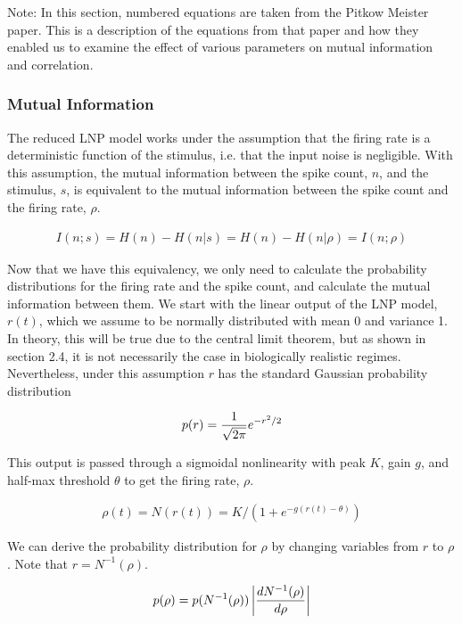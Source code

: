 \documentclass[12pt]{article}
\begin{document}
Note: In this section, numbered equations are taken from the Pitkow Meister paper. This is a description of the equations from that paper and how they enabled us to examine the effect of various parameters on mutual information and correlation.

\subsubsection{Mutual Information}

The reduced LNP model works under the assumption that the firing rate is a deterministic function of the stimulus, i.e. that the input noise is negligible. With this assumption, the mutual information between the spike count, $n$, and the stimulus, $s$, is equivalent to the mutual information between the spike count and the firing rate, $\rho$.

\begin{align}
\displaystyle I(n;s) = H(n)-H(n|s)=H(n)-H(n|\rho)=I(n;\rho) \tag{18}
\end{align}

\noindent Now that we have this equivalency, we only need to calculate the probability distributions for the firing rate and the spike count, and calculate the mutual information between them. We start with the linear output of the LNP model, $r(t)$, which we assume to be normally distributed with mean 0 and variance 1. In theory, this will be true due to the central limit theorem, but as shown in section 2.4, it is not necessarily the case in biologically realistic regimes. Nevertheless, under this assumption $r$ has the standard Gaussian probability distribution

\begin{align}
\displaystyle p(r) = \frac{1}{\sqrt{2\pi}}e^{-r^2/2} \notag
\end{align}

\noindent This output is passed through a sigmoidal nonlinearity with peak $K$, gain $g$, and half-max threshold $\theta$ to get the firing rate, $\rho$.

\begin{align}
\displaystyle \rho(t) = N(r(t)) = K \Big/ \left(1+e^{-g(r(t)-\theta)}\right) \tag{8, 10}
\end{align}

\noindent We can derive the probability distribution for $\rho$ by changing variables from $r$ to $\rho$. Note that $r=N^{-1}(\rho)$.

\begin{align}
\displaystyle p(\rho) = p(N^{-1}(\rho))\left | \frac{dN^{-1}(\rho)}{d\rho} \right | \notag
\end{align}
\end{document}
